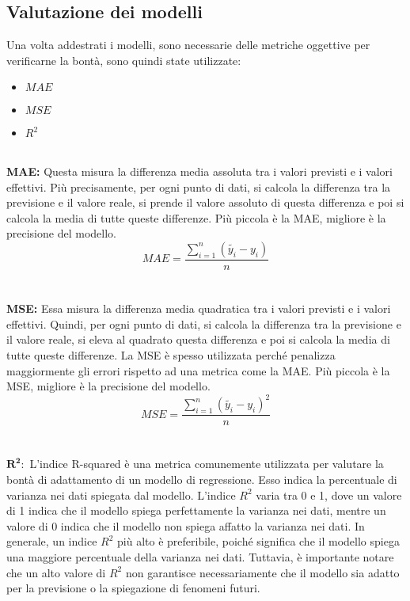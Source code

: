 \documentclass{article}
\begin{document}
        \subsection{Valutazione dei modelli}
        Una volta addestrati i modelli, sono necessarie delle metriche oggettive per verificarne la bontà, sono quindi state utilizzate:\\
        \begin{itemize}
            \item $MAE$
            \item $MSE$
            \item $R^2$
        \end{itemize}
        \\
        \textbf{MAE: }Questa misura la differenza media assoluta tra i valori previsti e i valori effettivi. Più precisamente, per ogni punto di dati, si calcola la differenza tra la previsione e il valore reale, si prende il valore assoluto di questa differenza e poi si calcola la media di tutte queste differenze. Più piccola è la MAE, migliore è la precisione del modello.\newline
        \[
                        MAE = \frac{\sum_{i=1}^{n}(\tilde{y_i} - y_i)}{n}
        \]
        \\
        \\
        \textbf{MSE: }Essa misura la differenza media quadratica tra i valori previsti e i valori effettivi. Quindi, per ogni punto di dati, si calcola la differenza tra la previsione e il valore reale, si eleva al quadrato questa differenza e poi si calcola la media di tutte queste differenze. La MSE è spesso utilizzata perché penalizza maggiormente gli errori rispetto ad una metrica come la MAE. Più piccola è la MSE, migliore è la precisione del modello.\newline
        \[
                        MSE = \frac{\sum_{i=1}^{n}(\tilde{y_i} - y_i)^2}{n}
        \]
        \\
        \\
        $\mathbf{R^2: }$ L'indice R-squared è una metrica comunemente utilizzata per valutare la bontà di adattamento di un modello di regressione. Esso indica la percentuale di varianza nei dati spiegata dal modello.\newline
        L'indice $R^2$ varia tra 0 e 1, dove un valore di 1 indica che il modello spiega perfettamente la varianza nei dati, mentre un valore di 0 indica che il modello non spiega affatto la varianza nei dati.
        In generale, un indice $R^2$ più alto è preferibile, poiché significa che il modello spiega una maggiore percentuale della varianza nei dati. Tuttavia, è importante notare che un alto valore di $R^2$ non garantisce necessariamente che il modello sia adatto per la previsione o la spiegazione di fenomeni futuri.\newline
\end{document}
